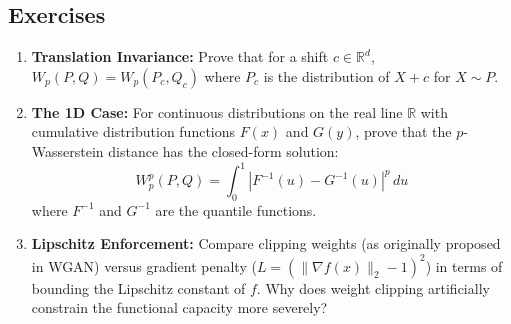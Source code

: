 \subsection*{Exercises}
\begin{enumerate}
    \item \textbf{Translation Invariance:} Prove that for a shift $c \in \mathbb{R}^d$, $W_p(P, Q) = W_p(P_c, Q_c)$ where $P_c$ is the distribution of $X+c$ for $X \sim P$.
    \item \textbf{The 1D Case:} For continuous distributions on the real line $\mathbb{R}$ with cumulative distribution functions $F(x)$ and $G(y)$, prove that the $p$-Wasserstein distance has the closed-form solution:
    \[ W_p^p(P, Q) = \int_0^1 |F^{-1}(u) - G^{-1}(u)|^p \, du \]
    where $F^{-1}$ and $G^{-1}$ are the quantile functions.
    \item \textbf{Lipschitz Enforcement:} Compare clipping weights (as originally proposed in WGAN) versus gradient penalty ($L= (\|\nabla f(x)\|_2 - 1)^2$) in terms of bounding the Lipschitz constant of $f$. Why does weight clipping artificially constrain the functional capacity more severely?
\end{enumerate}

